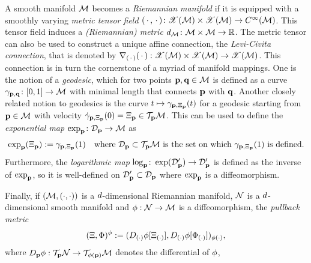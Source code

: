 A smooth manifold $\mathcal{M}$ becomes a \emph{Riemannian manifold} if it is equipped with a smoothly varying \emph{metric tensor field} $(\,\cdot\,, \,\cdot\,) \colon \mathscr{X}(\mathcal{M}) \times \mathscr{X}(\mathcal{M}) \to C^\infty(\mathcal{M})$. This tensor field induces a \emph{(Riemannian) metric} $d_{\mathcal{M}} \colon \mathcal{M}\times\mathcal{M}\to\mathbb{R}$. The metric tensor can also be used to construct a unique affine connection, the \emph{Levi-Civita connection}, that is denoted by $\nabla_{(\,\cdot\,)}(\,\cdot\,) : \mathscr{X}(\mathcal{M}) \times \mathscr{X}(\mathcal{M}) \to \mathscr{X}(\mathcal{M})$. 
This connection is in turn the cornerstone of a myriad of manifold mappings.
One is the notion of a \emph{geodesic}, which for two points $\mathbf{p},\mathbf{q} \in \mathcal{M}$ is defined as a curve $\gamma_{\mathbf{p},\mathbf{q}} \colon [0,1] \to \mathcal{M}$ with minimal length that connects $\mathbf{p}$ with $\mathbf{q}$. 
Another closely related notion to geodesics is the curve $t \mapsto \gamma_{\mathbf{p},\Xi_{\mathbf{p}}}(t)$  for a geodesic starting from $\mathbf{p}\in\mathcal{M}$ with velocity $\dot{\gamma}_{\mathbf{p},\Xi_{\mathbf{p}}} (0) = \Xi_{\mathbf{p}} \in \mathcal{T}_{\mathbf{p}}\mathcal{M}$. This can be used to define the \emph{exponential map} $\exp_{\mathbf{p}} \colon \mathcal{D}_{\mathbf{p}} \to \mathcal{M}$ as 
\begin{equation}
\exp_{\mathbf{p}}(\Xi_{\mathbf{p}}) := \gamma_{\mathbf{p},\Xi_{\mathbf{p}}}(1)
\quad\text{where $\mathcal{D}_{\mathbf{p}} \subset \mathcal{T}_{\mathbf{p}}\mathcal{M}$ is the set on which $\gamma_{\mathbf{p},\Xi_{\mathbf{p}}}(1)$ is defined.} 
\end{equation}
Furthermore, the \emph{logarithmic map} $\log_{\mathbf{p}} \colon \exp(\mathcal{D}'_{\mathbf{p}} ) \to \mathcal{D}'_{\mathbf{p}}$ is defined as the inverse of $\exp_{\mathbf{p}}$, so it is well-defined on  $\mathcal{D}'_{\mathbf{p}} \subset \mathcal{D}_{\mathbf{p}}$ where $\exp_{\mathbf{p}}$ is a diffeomorphism. 

Finally, if $(\mathcal{M}, (\cdot,\cdot))$ is a $d$-dimensional Riemannian manifold, $\mathcal{N}$ is a $d$-dimensional smooth manifold and $\phi:\mathcal{N} \to \mathcal{M}$ is a diffeomorphism, the \emph{pullback metric}
\begin{equation}
    (\Xi, \Phi)^\phi := (D_{(\cdot)}\phi[\Xi_{(\cdot)}], D_{(\cdot)}\phi[\Phi_{(\cdot)}])_{\phi(\cdot)},
    \label{eq:pull-back-metric}
\end{equation}
where $D_{\mathbf{p}}\phi: \mathcal{T}_{\mathbf{p}} \mathcal{N} \to \mathcal{T}_{\phi(\mathbf{p})} \mathcal{M}$ denotes the differential of $\phi$,

